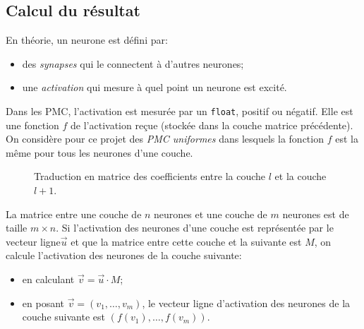 \documentclass[a4paper]{article}
\begin{document}
\subsection{Calcul du résultat}

En théorie, un neurone est défini par:
\begin{itemize}
\item des \emph{synapses} qui le connectent à d'autres neurones;
\item une \emph{activation} qui mesure à quel point un neurone est \og excité\fg{}.
\end{itemize}
Dans les PMC, l'activation est mesurée par un \texttt{float}, positif
ou négatif. Elle est une fonction \(f\) de l'activation reçue (stockée
dans la couche matrice précédente). On considère pour ce projet des
\emph{PMC uniformes} dans lesquels la fonction \(f\) est la même pour
tous les neurones d'une couche.

\begin{figure}[htbp]
  \centering
{}
\caption{Traduction en matrice des coefficients entre la couche \(l\)
  et la couche \(l+1\).}
  \label{fig:reseau:matrice}
\end{figure}

La matrice entre une couche de \(n\) neurones et une couche de \(m\)
neurones est de taille \(m\times n\). Si l'activation des neurones
d'une couche est représentée par le vecteur ligne\(\vec u\) et que la
matrice entre cette couche et la suivante est \(M\), on calcule
l'activation des neurones de la couche suivante:
\begin{itemize}
\item en calculant \(\vec v = \vec u \cdot M\);
\item en posant \(\vec v=(v_1,\ldots,v_m)\), le vecteur ligne d'activation
  des neurones de la couche suivante est \((f(v_1),\ldots,f(v_m))\).
\end{itemize}
\end{document}
